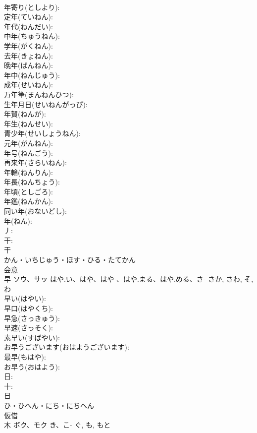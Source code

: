 \documentclass[8pt]{extreport}
\begin{document}
\begin{CJK}{UTF8}{min}
\\	年寄り(としより): 
\\	定年(ていねん): 
\\	年代(ねんだい): 
\\	中年(ちゅうねん): 
\\	学年(がくねん): 
\\	去年(きょねん): 
\\	晩年(ばんねん): 
\\	年中(ねんじゅう): 
\\	成年(せいねん): 
\\	万年筆(まんねんひつ): 
\\	生年月日(せいねんがっぴ): 
\\	年賀(ねんが): 
\\	年生(ねんせい): 
\\	青少年(せいしょうねん): 
\\	元年(がんねん): 
\\	年号(ねんごう): 
\\	再来年(さらいねん): 
\\	年輪(ねんりん): 
\\	年長(ねんちょう): 
\\	年頃(としごろ): 
\\	年鑑(ねんかん): 
\\	同い年(おないどし): 
\\	年(ねん): 
\\	丿: 
\\	干: 
\\	干	
\\	かん・いちじゅう・ほす・ひる・たてかん	
\\	会意 
\\	早	ソウ、サッ	はや.い、はや、はや-、はや.まる、はや.める、さ-	さか, さわ, そ, わ	
\\	早い(はやい): 
\\	早口(はやくち): 
\\	早急(さっきゅう): 
\\	早速(さっそく): 
\\	素早い(すばやい): 
\\	お早うございます(おはようございます): 
\\	最早(もはや): 
\\	お早う(おはよう): 
\\	日: 
\\	十: 
\\	日	
\\	ひ・ひへん・にち・にちへん	
\\	仮借 
\\	木	ボク、モク	き、こ-	ぐ, も, もと	

\end{CJK}
\end{document}
